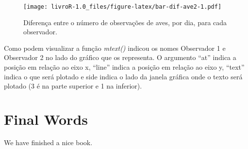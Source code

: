 \documentclass[titlepage, oneside, openany, a4paper]{book}
\begin{document}
\begin{figure}
\centering
\texttt{[image: livroR-1.0\_files/figure-latex/bar-dif-ave2-1.pdf]}
\caption{\label{fig:bar-dif-ave2}Diferença entre o número de observações de aves, por dia, para cada observador.}
\end{figure}

Como podem visualizar a função \emph{mtext()} indicou os nomes Observador 1 e Observador 2 no lado do gráfico que os representa. O argumento ``at'' indica a posição em relação ao eixo x, ``line'' indica a posição em relação ao eixo y, ``text'' indica o que será plotado e side indica o lado da janela gráfica onde o texto será plotado (3 é na parte superior e 1 na inferior).

\hypertarget{final-words}{%
\chapter{Final Words}\label{final-words}}

We have finished a nice book.


\end{document}
